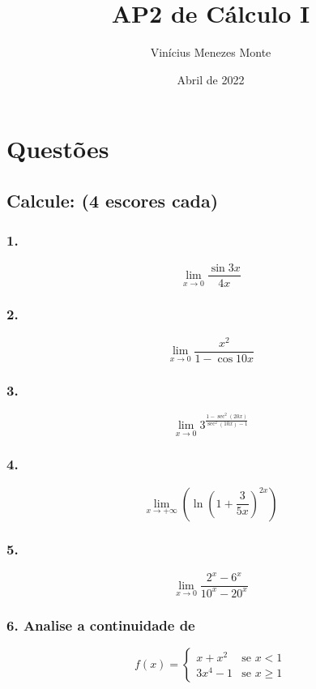 \documentclass{article}
\title{AP2 de Cálculo I}
\author{Vinícius Menezes Monte}
\date{Abril de 2022}
\begin{document}
\maketitle

\section*{Questões}
\subsection*{Calcule: (4 escores cada)}
\subsubsection*{1.}

\[
    \lim_{x \to 0} \frac{\sin 3x}{4x}
\]

\subsubsection*{2.}

\[
    \lim_{x \to 0} \frac{x^2}{1 - \cos 10x}
\]

\subsubsection*{3.}

\[
    \lim_{x \to 0} 3^{\frac{1 - \sec^2(20x) }{\sec^2(10x) - 1}}
\]

\subsubsection*{4.}

\[
    \lim_{x \to +\infty}
    \left(
    \ln
    \left(
        1 + \frac{3}{5x}
        \right)
        ^{2x}
    \right)
\]

\subsubsection*{5.}

\[
    \lim_{x \to 0} \frac{2^x - 6^x}{10^x - 20^x}
\]

\subsubsection*{6. Analise a continuidade de}

\begin{equation} \label{question_6_func_def}
    f(x) =
    \left\{
    \begin{array}{ll}
        x + x^2  & \mbox{se } x < 1     \\
        3x^4 - 1 & \mbox{se } x \geq  1
    \end{array}
    \right.
\end{equation}
\end{document}
